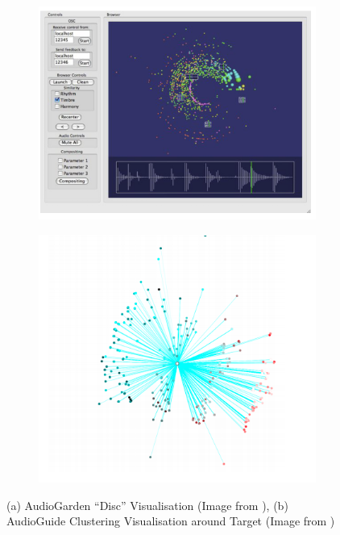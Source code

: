 \begin{figure}
\centering
\begin{subfigure}[b]{0.9\textwidth}
   \includegraphics[width=1\linewidth]{ch04_sota/figures/audiogarden.png}
   \caption{}
   \label{fig:Ng1} 
\end{subfigure}

\begin{subfigure}[b]{0.9\textwidth}
   \includegraphics[width=1\linewidth]{ch04_sota/figures/audioguide.png}
   \caption{}
   \label{fig:audioguide}
\end{subfigure}

\caption[Two numerical solutions]{(a) AudioGarden ``Disc'' Visualisation (Image from \cite{Frisson2010}), (b) AudioGuide Clustering Visualisation around Target (Image from \cite{Schwarz2012})}
\end{figure}

